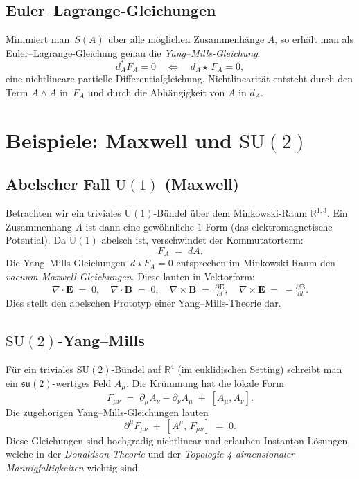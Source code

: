 \documentclass[10pt, letterpaper]{article}
\theoremstyle{custom}
\theoremstyle{definition}
\begin{document}
\subsection{Euler--Lagrange-Gleichungen}
Minimiert man \(\,S(A)\) über alle möglichen Zusammenhänge \(A\), so erhält man als Euler--Lagrange-Gleichung genau die \emph{Yang--Mills-Gleichung}:
\[
d_A^* F_A = 0 
\quad\Longleftrightarrow\quad
d_A \star\,F_A = 0,
\]
eine nichtlineare partielle Differentialgleichung.  
Nichtlinearität entsteht durch den Term \(A\wedge A\) in \(\,F_A\) und durch die Abhängigkeit von \(A\) in \(d_A\).

\section{Beispiele: Maxwell und \(\mathrm{SU}(2)\)}

\subsection{Abelscher Fall \(\mathrm{U}(1)\) (Maxwell)}
Betrachten wir ein triviales \(\mathrm{U}(1)\)-Bündel über dem Minkowski-Raum \(\mathbb{R}^{1,3}\). Ein Zusammenhang \(A\) ist dann eine gewöhnliche \(1\)-Form (das elektromagnetische Potential). Da \(\mathrm{U}(1)\) abelsch ist, verschwindet der Kommutatorterm:
\[
F_A \;=\; dA.
\]
Die Yang--Mills-Gleichungen \(\,d\star F_A=0\) entsprechen im Minkowski-Raum den \emph{vacuum Maxwell-Gleichungen}. Diese lauten in Vektorform:
\[
\nabla \cdot \mathbf{E} \;=\; 0, 
\quad
\nabla \cdot \mathbf{B} \;=\; 0,
\quad
\nabla\times \mathbf{B} \;=\; \tfrac{\partial \mathbf{E}}{\partial t},
\quad
\nabla\times \mathbf{E} \;=\; -\tfrac{\partial \mathbf{B}}{\partial t}.
\]
Dies stellt den abelschen Prototyp einer Yang--Mills-Theorie dar.

\subsection{\(\mathrm{SU}(2)\)-Yang--Mills}
Für ein triviales \(\mathrm{SU}(2)\)-Bündel auf \(\mathbb{R}^4\) (im euklidischen Setting) schreibt man ein \(\mathfrak{su}(2)\)-wertiges Feld \(A_\mu\). Die Krümmung hat die lokale Form
\[
F_{\mu\nu} \;=\;
\partial_\mu A_\nu
-\partial_\nu A_\mu
\;+\;
[A_\mu, A_\nu].
\]
Die zugehörigen Yang--Mills-Gleichungen lauten
\[
\partial^\mu F_{\mu\nu}
\;+\;
[A^\mu,\,F_{\mu\nu}]
\;=\;
0.
\]
Diese Gleichungen sind hochgradig nichtlinear und erlauben Instanton-Lösungen, welche in der \emph{Donaldson-Theorie} und der \emph{Topologie 4-dimensionaler Mannigfaltigkeiten} wichtig sind.
\end{document}
